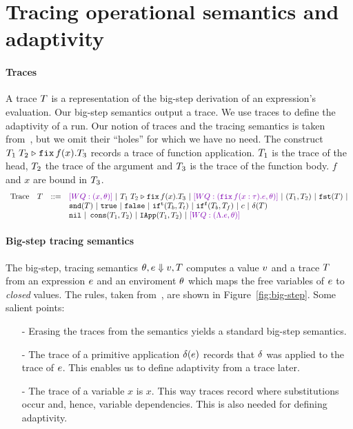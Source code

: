 \documentclass[a4paper,11pt]{article}
\newcommand{\wq}[1]{\textcolor[rgb]{.50,0.0,0.7}{[WQ: #1]}}
\theoremstyle{definition}
\begin{document}



\section{Tracing operational semantics and adaptivity}

\paragraph{Traces}
A trace $T$ is a representation of the big-step derivation of an
expression's evaluation. Our big-step semantics output a trace. We use
traces to define the adaptivity of a run. Our notion of traces and the
tracing semantics is taken from~\cite[Section 4]{perera:dep}, but we
omit their ``holes'' for which we have no need. The construct
$T_1 \; T_2 \mathrel{\triangleright} {\mathop{\mathtt{fix}} f(x).T_3}$ records a trace of function
application. $T_1$ is the trace of the head, $T_2$ the trace of
the argument and $T_3$ is the trace of the function body. $f$ and
$x$ are bound in $T_3$.
%
\[\begin{array}{llll}
\mbox{Trace} & \tr & ::= & \wq{(x, \env)} ~|~ \trapp{\tr_1}{\tr_2}{f}{x}{\tr_3} ~|~
\wq{ (\trfix f(x:\type).e, \env) } ~|~ (\tr_1, \tr_2) ~|~ \trprojl(\tr) ~|\\ 
%
& & & \trprojr(\tr) ~|~ \trtrue ~|~ \trfalse ~|~ \trift(\tr_b, \tr_t)
~|~ \triff(\tr_b, \tr_f) ~|~ \trconst ~|~ \trop(\tr) \\
%
& & & \trnil ~|~ \trcons (\tr_1, \tr_2) ~|~ \triapp{\tr_1}{\tr_2} ~|~
      \wq {(\eilam \expr, \env)}
\end{array}\]


\paragraph{Big-step tracing semantics}
The big-step, tracing semantics $\theta, e \mathrel{\Downarrow} v, T$
computes a value $v$ and a trace $T$ from an expression $e$
and an enviroment $\theta$ which maps the free variables of $e$ to
\emph{closed} values. The rules, taken from~\cite{perera:dep}, are
shown in Figure~\ref{fig:big-step}. Some salient points:
\begin{itemize}
\item[-] Erasing the traces from the semantics yields a standard
  big-step semantics.
\item[-] The trace of a primitive application $\delta(e)$
  records that $\delta$ was applied to the trace of
  $e$. This enables us to define adaptivity from a trace later.
\item[-] The trace of a variable $x$ is $x$. This way traces record
  where substitutions occur and, hence, variable dependencies. This is
  also needed for defining adaptivity.
\end{itemize}
\end{document}
